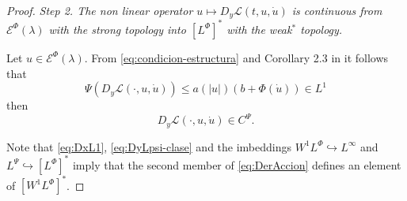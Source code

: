 \documentclass[twoside]{article}
\theoremstyle{remark}
\newcommand{\lphi}{L^{\Phi}}
\newcommand{\lpsi}{L^{\Psi}}
\newcommand{\wphi}{W^{1}\lphi}
\newcommand{\domi}{\mathcal{E}^{\Phi}(\lambda)}
\renewcommand{\leq}{\leqslant}
\begin{document}
\begin{proof}
\noindent\emph{Step 2. The non linear operator   $u
 \mapsto  D_{y}\mathcal{L}(t,u,\dot{u})$ is continuous from $\domi$ with the strong topology  
into $\left[\lphi\right]^*$  with the weak$^*$ topology.}

 Let $u\in \domi$.  From  \eqref{eq:condicion-estructura} and Corollary 2.3 in \cite{ABGMS2015} it follows that 
\begin{equation}\label{eq:DyLpsi}
\Psi(D_y\mathcal{L}(\cdot,u,\dot{u}))\leq a(|u|)(b+\Phi(\dot{u}))\in L^1
\end{equation}
then
\begin{equation}\label{eq:DyLpsi-clase}
D_{y}\mathcal{L}(\cdot,u,\dot{u})\in C^{\Psi}.
\end{equation}



 Note that \eqref{eq:DxL1},  \eqref{eq:DyLpsi-clase} and the imbeddings $\wphi \hookrightarrow L^{\infty}$ and  
$\lpsi\hookrightarrow  \left[\lphi\right]^*$ imply that the second member of
\eqref{eq:DerAccion} defines an element of $\left[\wphi\right]^*$.




\end{proof}
\end{document}
